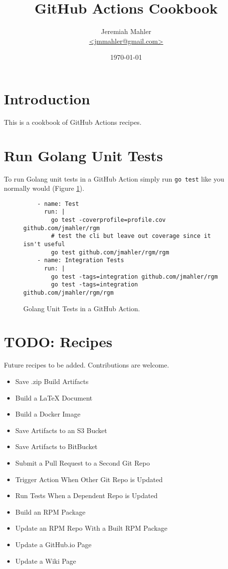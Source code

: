 \documentclass{article}
\begin{document}
\title{GitHub Actions Cookbook}
\author{
	\Large{Jeremiah Mahler}\\
	\small{\href{mailto:jmmahler@gmail.com}{\textless jmmahler@gmail.com\textgreater}}
}
\date{\today}
\maketitle

\thispagestyle{empty}
\tableofcontents

\section{Introduction}

This is a cookbook of GitHub Actions \autocite{githubactions} recipes.

\section{Run Golang Unit Tests}

To run Golang unit tests in a GitHub Action simply run \verb+go test+
like you normally would \autocite{gotest} (Figure \ref{fig:gotest}).

\begin{figure}[!ht]
\begin{lstlisting}
    - name: Test
      run: |
        go test -coverprofile=profile.cov github.com/jmahler/rgm
        # test the cli but leave out coverage since it isn't useful
        go test github.com/jmahler/rgm/rgm
    - name: Integration Tests
      run: |
        go test -tags=integration github.com/jmahler/rgm
        go test -tags=integration github.com/jmahler/rgm/rgm
\end{lstlisting}
\caption{Golang Unit Tests in a GitHub Action.}
\label{fig:gotest}
\end{figure}

\section{TODO: Recipes}

Future recipes to be added.
Contributions are welcome.

\begin{itemize}
\item{Save .zip Build Artifacts}
\item{Build a LaTeX Document}
\item{Build a Docker Image}
\item{Save Artifacts to an S3 Bucket}
\item{Save Artifacts to BitBucket}
\item{Submit a Pull Request to a Second Git Repo}
\item{Trigger Action When Other Git Repo is Updated}
\item{Run Tests When a Dependent Repo is Updated}
\item{Build an RPM Package}
\item{Update an RPM Repo With a Built RPM Package}
\item{Update a GitHub.io Page}
\item{Update a Wiki Page}
\end{itemize}

\clearpage
\printbibliography[heading=bibintoc]
\end{document}
